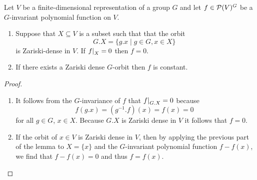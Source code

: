 \begin{lemma}\label{lemma: zariski density orbits}
  Let $V$ be a finite-dimensional representation of a group $G$ and let $f \in \mathcal{P}(V)^G$ be a $G$-invariant polynomial function on $V$.
  \begin{enumerate}
    \item
      Suppose that $X \subseteq V$ is a subset such that that the orbit
      \[
          G.X
        = \{
            g.x
          \mid
            g \in G,
            x \in X
          \}
      \]
      is Zariski-dense in $V$.
      If $\restrict{f}{X} = 0$ then $ f= 0$.
    \item
      If there exists a Zariski dense $G$-orbit then $f$ is constant.
  \end{enumerate}
\end{lemma}
\begin{proof}
  \leavevmode
  \begin{enumerate}
    \item
      It follows from the $G$-invariance of $f$ that $\restrict{f}{G.X} = 0$ because
      \[
          f(g.x)
        = \left( g^{-1}.f \right)(x)
        = f(x)
        = 0
      \]
      for all $g \in G$, $x \in X$.
      Because $G.X$ is Zariski dense in $V$ it follows that $f = 0$.
    \item
      If the orbit of $x \in V$ is Zariski dense in $V$, then by applying the previous part of the lemma to $X = \{x\}$ and the $G$-invariant polynomial function $f - f(x)$, we find that $f - f(x) = 0$ and thus $f = f(x)$.
    \qedhere
  \end{enumerate}
\end{proof}


